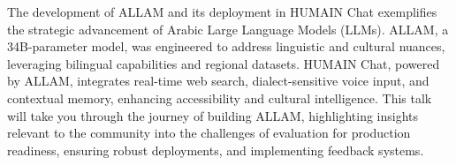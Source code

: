 The development of ALLAM and its deployment in  HUMAIN Chat exemplifies the strategic advancement of Arabic Large Language Models (LLMs). ALLAM, a 34B-parameter model, was engineered to address linguistic and cultural nuances, leveraging bilingual capabilities and regional datasets. HUMAIN Chat, powered by ALLAM, integrates real-time web search, dialect-sensitive voice input, and contextual memory, enhancing accessibility and cultural intelligence. This talk will take you through the journey of building ALLAM, highlighting insights relevant to the community into the challenges of evaluation for production readiness, ensuring robust deployments, and implementing feedback systems.